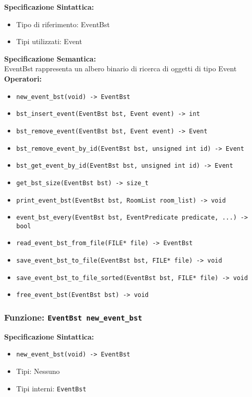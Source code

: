 \documentclass[11pt]{scrartcl} %
\begin{document}
\textbf{Specificazione Sintattica:}
\begin{itemize}
	\item Tipo di riferimento: EventBst
	\item Tipi utilizzati: Event
\end{itemize}
\textbf{Specificazione Semantica:} \\
EventBst rappresenta un albero binario di ricerca di oggetti di tipo Event\\

\textbf{Operatori:} 
\begin{itemize}
    \item \texttt{new\_event\_bst(void) -> EventBst}
    \item \texttt{bst\_insert\_event(EventBst bst, Event event) -> int}
    \item \texttt{bst\_remove\_event(EventBst bst, Event event) -> Event}
    \item \texttt{bst\_remove\_event\_by\_id(EventBst bst, unsigned int id) -> Event}
    \item \texttt{bst\_get\_event\_by\_id(EventBst bst, unsigned int id) -> Event}
    \item \texttt{get\_bst\_size(EventBst bst) -> size\_t}
    \item \texttt{print\_event\_bst(EventBst bst, RoomList room\_list) -> void}
    \item \texttt{event\_bst\_every(EventBst bst, EventPredicate predicate, ...) -> bool}
    \item \texttt{read\_event\_bst\_from\_file(FILE* file) -> EventBst}
    \item \texttt{save\_event\_bst\_to\_file(EventBst bst, FILE* file) -> void}
    \item \texttt{save\_event\_bst\_to\_file\_sorted(EventBst bst, FILE* file) -> void}
    \item \texttt{free\_event\_bst(EventBst bst) -> void}
\end{itemize}


\subsubsection{Funzione: \texttt{EventBst new\_event\_bst}}

\textbf{Specificazione Sintattica:}
\begin{itemize}
\item \texttt{new\_event\_bst(void) -> EventBst}
\item Tipi: Nessuno
\item Tipi interni: \texttt{EventBst}
\end{itemize}
\end{document}
